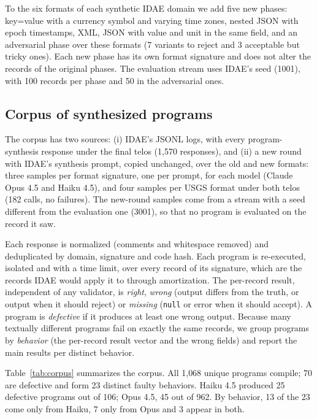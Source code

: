 \documentclass[sigconf,nonacm]{acmart}
\begin{document}
To the six formats of each synthetic IDAE domain we add five new phases: key=value with a currency symbol and varying time zones, nested JSON with epoch timestamps, XML, JSON with value and unit in the same field, and an adversarial phase over these formats (7 variants to reject and 3 acceptable but tricky ones). Each new phase has its own format signature and does not alter the records of the original phases. The evaluation stream uses IDAE's seed (1001), with 100 records per phase and 50 in the adversarial ones.

\subsection{Corpus of synthesized programs}
\label{sec:corpus}

The corpus has two sources: (i) IDAE's JSONL logs, with every program-synthesis response under the final telos (1{,}570 responses), and (ii) a new round with IDAE's synthesis prompt, copied unchanged, over the old and new formats: three samples per format signature, one per prompt, for each model (Claude Opus 4.5 and Haiku 4.5), and four samples per USGS format under both telos (182 calls, no failures). The new-round samples come from a stream with a seed different from the evaluation one (3001), so that no program is evaluated on the record it saw.

Each response is normalized (comments and whitespace removed) and deduplicated by domain, signature and code hash. Each program is re-executed, isolated and with a time limit, over every record of its signature, which are the records IDAE would apply it to through amortization. The per-record result, independent of any validator, is \textit{right}, \textit{wrong} (output differs from the truth, or output when it should reject) or \textit{missing} (\texttt{null} or error when it should accept). A program is \textit{defective} if it produces at least one wrong output. Because many textually different programs fail on exactly the same records, we group programs by \textit{behavior} (the per-record result vector and the wrong fields) and report the main results per distinct behavior.

Table~\ref{tab:corpus} summarizes the corpus. All 1{,}068 unique programs compile; 70 are defective and form 23 distinct faulty behaviors. Haiku 4.5 produced 25 defective programs out of 106; Opus 4.5, 45 out of 962. By behavior, 13 of the 23 come only from Haiku, 7 only from Opus and 3 appear in both.
\end{document}
